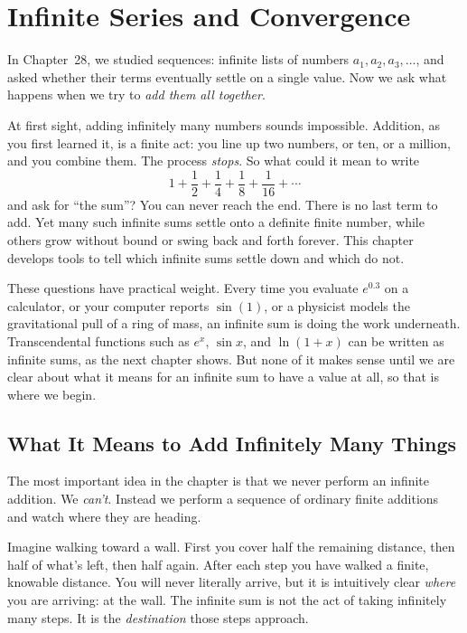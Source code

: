 \chapter{Infinite Series and Convergence}

In Chapter~28, we studied sequences: infinite lists of numbers $a_1, a_2, a_3, \dots$, and asked whether their terms eventually settle on a single value. Now we ask what happens when we try to \emph{add them all together}.

At first sight, adding infinitely many numbers sounds impossible. Addition, as you first learned it, is a finite act: you line up two numbers, or ten, or a million, and you combine them. The process \emph{stops}. So what could it mean to write
\[
1 + \frac{1}{2} + \frac{1}{4} + \frac{1}{8} + \frac{1}{16} + \cdots
\]
and ask for ``the sum''? You can never reach the end. There is no last term to add. Yet many such infinite sums settle onto a definite finite number, while others grow without bound or swing back and forth forever. This chapter develops tools to tell which infinite sums settle down and which do not.

These questions have practical weight. Every time you evaluate $e^{0.3}$ on a calculator, or your computer reports $\sin(1)$, or a physicist models the gravitational pull of a ring of mass, an infinite sum is doing the work underneath. Transcendental functions such as $e^x$, $\sin x$, and $\ln(1+x)$ can be written as infinite sums, as the next chapter shows. But none of it makes sense until we are clear about what it means for an infinite sum to have a value at all, so that is where we begin.

\section{What It Means to Add Infinitely Many Things}
\label{ch29:partial-sums}

The most important idea in the chapter is that we never perform an infinite addition. We \emph{can't}. Instead we perform a sequence of ordinary finite additions and watch where they are heading.

\begin{intuitionbox}
Imagine walking toward a wall. First you cover half the remaining distance, then half of what's left, then half again. After each step you have walked a finite, knowable distance. You will never literally arrive, but it is intuitively clear \emph{where} you are arriving: at the wall. The infinite sum is not the act of taking infinitely many steps. It is the \emph{destination} those steps approach.
\end{intuitionbox}

